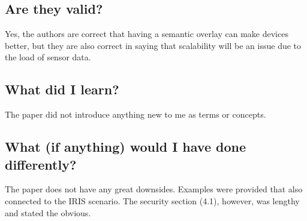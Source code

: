 \documentclass[11pt,a4paper]{article}
\begin{document}
\subsection*{Are they valid?}
Yes, the authors are correct that having a semantic overlay can make devices better, but they are also correct in saying that scalability will be an issue due to the load of sensor data. 

\subsection*{What did I learn?}
The paper did not introduce anything new to me as terms or concepts. 

\subsection*{What (if anything) would I have done differently?}
The paper does not have any great downsides. Examples were provided that also connected to the IRIS scenario. The security section (4.1), however, was lengthy and stated the obvious.
\end{document}
